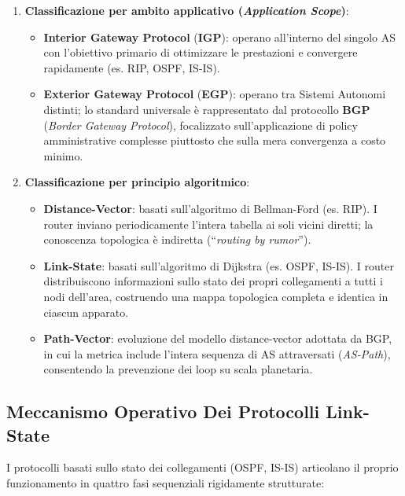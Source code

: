 \documentclass[11pt, a4paper]{article}
\begin{document}
\begin{enumerate}
    \item \textbf{Classificazione per ambito applicativo (\emph{Application Scope})}:
    \begin{itemize}
        \item \textbf{Interior Gateway Protocol} (\textbf{IGP}): operano all'interno del singolo AS con l'obiettivo primario di ottimizzare le prestazioni e convergere rapidamente (es. RIP, OSPF, IS-IS).
        \item \textbf{Exterior Gateway Protocol} (\textbf{EGP}): operano tra Sistemi Autonomi distinti; lo standard universale è rappresentato dal protocollo \textbf{BGP} (\emph{Border Gateway Protocol}), focalizzato sull'applicazione di policy amministrative complesse piuttosto che sulla mera convergenza a costo minimo.
    \end{itemize}

    \item \textbf{Classificazione per principio algoritmico}:
    \begin{itemize}
        \item \textbf{Distance-Vector}: basati sull'algoritmo di Bellman-Ford (es. RIP). I router inviano periodicamente l'intera tabella ai soli vicini diretti; la conoscenza topologica è indiretta (``\emph{routing by rumor}'').
        \item \textbf{Link-State}: basati sull'algoritmo di Dijkstra (es. OSPF, IS-IS). I router distribuiscono informazioni sullo stato dei propri collegamenti a tutti i nodi dell'area, costruendo una mappa topologica completa e identica in ciascun apparato.
        \item \textbf{Path-Vector}: evoluzione del modello distance-vector adottata da BGP, in cui la metrica include l'intera sequenza di AS attraversati (\emph{AS-Path}), consentendo la prevenzione dei loop su scala planetaria.
    \end{itemize}
\end{enumerate}

\subsection{Meccanismo Operativo Dei Protocolli Link-State}

I protocolli basati sullo stato dei collegamenti (OSPF, IS-IS) articolano il proprio funzionamento in quattro fasi sequenziali rigidamente strutturate:

\end{document}
